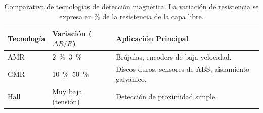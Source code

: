 
\begin{table}[!htbp]
    \centering
    \setlength{\tabcolsep}{3pt} %
    \begin{tabularx}{\linewidth}{M{2cm} M{2cm} X}
        \toprule
        \textbf{Tecnología} & \textbf{Variación ($\Delta R/R$)} & \textbf{Aplicación Principal} \\
        \midrule
        AMR & \SIrange{2}{3}{\percent} & Brújulas, encoders de baja velocidad. \\
        GMR & \SIrange{10}{50}{\percent} & Discos duros, sensores de ABS, aislamiento galvánico. \\
        Hall & Muy baja (tensión) & Detección de proximidad simple. \\
        \bottomrule
    \end{tabularx}
    \caption[Comparativa de tecnologías de detección magnética.]{Comparativa de tecnologías de detección magnética. La variación de resistencia se expresa en \% de la resistencia de la capa libre.\protect\label{tab:resumen_gmr}}
\end{table}




    



